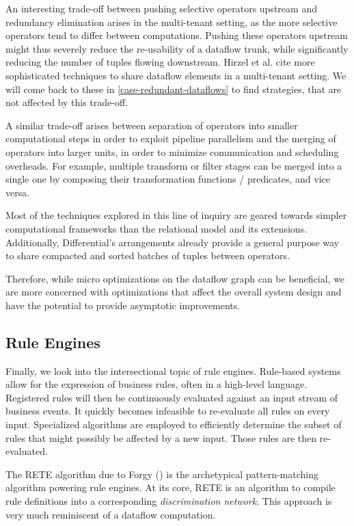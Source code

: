 \documentclass[../index.tex]{subfiles}
\begin{document}
An interesting trade-off between pushing selective operators upstream
and redundancy elimination arises in the multi-tenant setting, as the
more selective operators tend to differ between computations. Pushing
these operators upstream might thus severely reduce the re-usability
of a dataflow trunk, while significantly reducing the number of tuples
flowing downstream. Hirzel et al. cite more sophisticated techniques
to share dataflow elements in a multi-tenant setting. We will come
back to these in \autoref{case-redundant-dataflows} to find
strategies, that are not affected by this trade-off.

A similar trade-off arises between separation of operators into
smaller computational steps in order to exploit pipeline parallelism
and the merging of operators into larger units, in order to minimize
communication and scheduling overheads. For example, multiple
transform or filter stages can be merged into a single one by
composing their transformation functions / predicates, and vice versa.

Most of the techniques explored in this line of inquiry are geared
towards simpler computational frameworks than the relational model and
its extensions. Additionally, Differential's arrangements already
provide a general purpose way to share compacted and sorted batches of
tuples between operators.

Therefore, while micro optimizations on the dataflow graph can be
beneficial, we are more concerned with optimizations that affect the
overall system design and have the potential to provide asymptotic
improvements.

\subsection{Rule Engines}

Finally, we look into the intersectional topic of rule
engines. Rule-based systems allow for the expression of business
rules, often in a high-level language. Registered rules will then be
continuously evaluated against an input stream of business events. It
quickly becomes infeasible to re-evaluate all rules on every
input. Specialized algorithms are employed to efficiently determine
the subset of rules that might possibly be affected by a new
input. Those rules are then re-evaluated.

The RETE algorithm due to Forgy (\cite{forgy1989rete}) is the
archetypical pattern-matching algorithm powering rule engines. At its
core, RETE is an algorithm to compile rule definitions into a
corresponding \emph{discrimination network}. This approach is very
much reminiscent of a dataflow computation.
\end{document}
